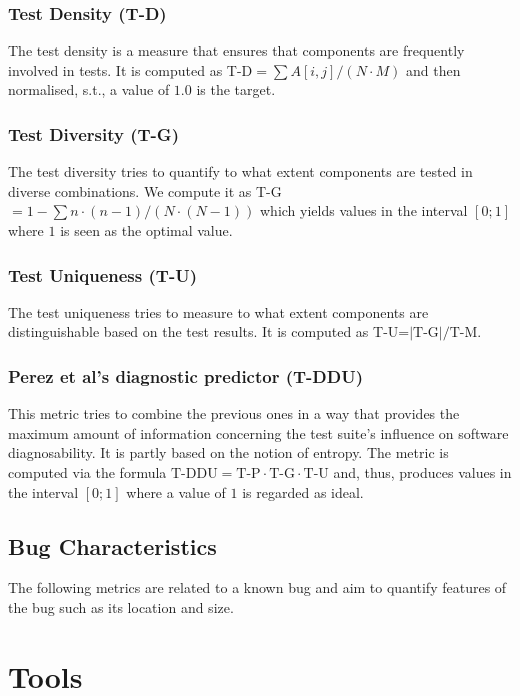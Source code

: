 \documentclass{scrartcl}
\begin{document}
\subsubsection{Test Density (T-D)}

The test density is a measure that ensures that components are frequently
involved in tests. It is computed as T-D$=\sum{A[i,j]}/(N\cdot M)$ and then
normalised, s.t., a value of $1.0$ is the target.

\subsubsection{Test Diversity (T-G)}

The test diversity tries to quantify to what extent components are tested in
diverse combinations. We compute it as T-G$=1 - \sum{n \cdot (n-1)}/ (N \cdot
(N-1))$ which yields values in the interval $[0;1]$ where $1$ is seen as the
optimal value.

\subsubsection{Test Uniqueness (T-U)}

The test uniqueness tries to measure to what extent components are
distinguishable based on the test results. It is computed as T-U=$|\textrm{T-G}|
/ \textrm{T-M}$. 

\subsubsection{Perez et al's diagnostic predictor (T-DDU)}

This metric tries to combine the previous ones in a way that provides the
maximum amount of information concerning the test suite's influence on software
diagnosability. It is partly based on the notion of entropy. The metric is
computed via the formula $\textrm{T-DDU} = \textrm{T-P} \cdot \textrm{T-G} \cdot
\textrm{T-U}$ and, thus, produces values in the interval $[0;1]$ where a value
of $1$ is regarded as ideal.

\subsection{Bug Characteristics}

The following metrics are related to a known bug and aim to quantify features of
the bug such as its location and size.

\section{Tools}
\end{document}
